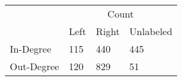     \centering
    \begin{tabular}{llll}
    \toprule\toprule
        & \multicolumn{3}{c}{Count} \\
             \cmidrule(lr){2-4} 
        ~ & Left & Right & Unlabeled \\ \midrule
        In-Degree & 115 & 440 & 445 \\ 
        Out-Degree & 120 & 829 & 51 \\ 
        \bottomrule\bottomrule
    \end{tabular}